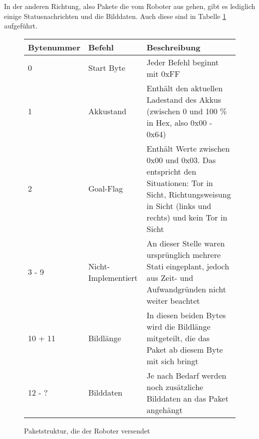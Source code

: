 In der anderen Richtung, also Pakete die vom Roboter aus gehen, gibt es lediglich einige Statusnachrichten und die Bilddaten. Auch diese sind in Tabelle \ref{tab:robot_to_serv} aufgeführt.



\begin{figure}[!h]
	\begin{tabular}{||p{}||p{}||p{}||}
		\hline Bytenummer & Befehl & Beschreibung \\ 
		\hline 0 & Start Byte &  Jeder Befehl beginnt mit 0xFF\\ 
		\hline 1 & Akkustand & Enthält den aktuellen Ladestand des Akkus (zwischen 0 und 100 \% in Hex, also 0x00 - 0x64) \\ 
		\hline 2 & Goal-Flag & Enthält Werte zwischen 0x00 und 0x03. Das entspricht den Situationen: Tor in Sicht, Richtungsweisung in Sicht (links und rechts) und kein Tor in Sicht \\ 
		\hline 3 - 9 & Nicht-Implementiert & An dieser Stelle waren ursprünglich mehrere Stati eingeplant, jedoch aus Zeit- und Aufwandgründen nicht weiter beachtet \\ 
		\hline 10 + 11 & Bildlänge & In diesen beiden Bytes wird die Bildlänge mitgeteilt, die das Paket ab diesem Byte mit sich bringt \\ 
		\hline 12 - ? & Bilddaten & Je nach Bedarf werden noch zusätzliche Bilddaten an das Paket angehängt \\
		\hline
	\end{tabular}  
	\caption{Paketstruktur, die der Roboter versendet}
	\label{tab:robot_to_serv}
\end{figure}                         

